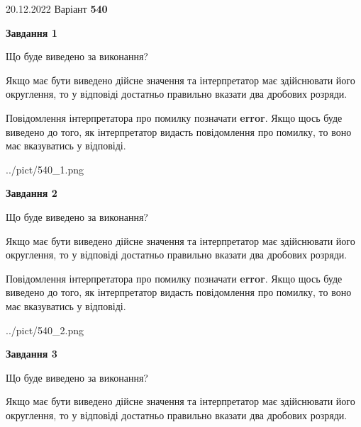 \documentclass[12pt, ukrainian]{article}
\begin{document}
{20.12.2022 Варіант \No \textbf { 540 }\par}
{
\begin {Large}

{\begin {center}\textbf{Завдання 1}\end {center}}\par
Що буде виведено за виконання? \par

Якщо має бути виведено дійсне значення та інтерпретатор має здійснювати його округлення, 
то у відповіді достатньо правильно вказати два дробових розряди.

Повідомлення інтерпретатора про помилку позначати \textbf{error}.
Якщо щось буде виведено до того, як інтерпретатор видасть повідомлення про помилку, 
то воно має вказуватись у відповіді. \par

\begin{center}
	{../pict/540_1.png}
\end{center}
\newpage

{\begin {center}\textbf{Завдання 2}\end {center}}\par
Що буде виведено за виконання? \par

Якщо має бути виведено дійсне значення та інтерпретатор має здійснювати його округлення, 
то у відповіді достатньо правильно вказати два дробових розряди.

Повідомлення інтерпретатора про помилку позначати \textbf{error}.
Якщо щось буде виведено до того, як інтерпретатор видасть повідомлення про помилку, 
то воно має вказуватись у відповіді. \par

\begin{center}
	{../pict/540_2.png}
\end{center}
\newpage

{\begin {center}\textbf{Завдання 3}\end {center}}\par
Що буде виведено за виконання? \par

Якщо має бути виведено дійсне значення та інтерпретатор має здійснювати його округлення, 
то у відповіді достатньо правильно вказати два дробових розряди.


\end{Large}}
\end{document}
